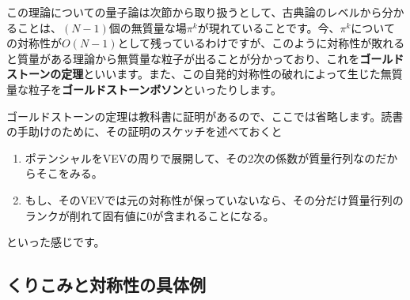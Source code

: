 \documentclass[unicode,a4paper,11pt]{ltjsarticle}
\theoremstyle{definition}
\begin{document}
この理論についての量子論は次節から取り扱うとして、古典論のレベルから分かることは、$(N-1)$個の無質量な場$\pi^{k}$が現れていることです。今、$\pi^{k}$についての対称性が$O(N-1)$として残っているわけですが、このように対称性が敗れると質量がある理論から無質量な粒子が出ることが分かっており、これを\textbf{ゴールドストーンの定理}といいます。また、この自発的対称性の破れによって生じた無質量な粒子を\textbf{ゴールドストーンボソン}といったりします。

ゴールドストーンの定理は教科書に証明があるので、ここでは省略します。読書の手助けのために、その証明のスケッチを述べておくと
\begin{enumerate}
   \item
         ポテンシャルをVEVの周りで展開して、その2次の係数が質量行列なのだからそこをみる。
   \item
         もし、そのVEVでは元の対称性が保っていないなら、その分だけ質量行列のランクが削れて固有値に0が含まれることになる。
\end{enumerate}
といった感じです。


\subsection{くりこみと対称性の具体例}
\end{document}
